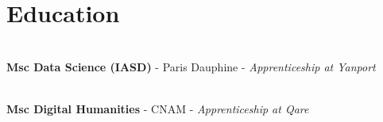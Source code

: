 \documentclass[a4paper,10pt]{article}
\begin{document}
\begin{adjustbox}{valign=t}
\begin{minipage}{0.6\textwidth}
        \section*{Education}
        \vspace{-.3cm}
        \begin{description}
            \raggedright
            \item [\normalfont \textcolor{ColorOne}{2021 -- 2022}]~\\
                  \textbf{Msc Data Science (IASD)} - Paris Dauphine - \textit{Apprenticeship at Yanport}\\
            \item [\normalfont \textcolor{ColorOne}{2019 -- 2021}]~\\
                  \textbf{Msc Digital Humanities} - CNAM - \textit{Apprenticeship at Qare}\\
        \end{description}
    \end{minipage}
\end{adjustbox}
\end{document}
